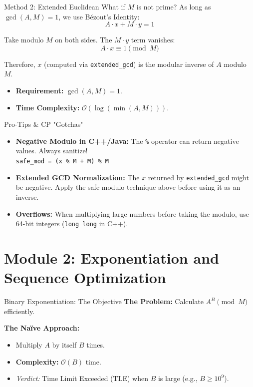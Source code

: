 \documentclass[aspectratio=169]{beamer}
\begin{document}
\begin{frame}{Method 2: Extended Euclidean}
    What if $M$ is not prime? As long as $\gcd(A, M) = 1$, we use Bézout's Identity:
    $$A \cdot x + M \cdot y = 1$$
    
    Take modulo $M$ on both sides. The $M \cdot y$ term vanishes:
    $$A \cdot x \equiv 1 \pmod M$$
    
    \vspace{0.5cm}
    Therefore, $x$ (computed via \texttt{extended\_gcd}) is the modular inverse of $A$ modulo $M$.
    \begin{itemize}
        \item \textbf{Requirement:} $\gcd(A, M) = 1$.
        \item \textbf{Time Complexity:} $\mathcal{O}(\log(\min(A, M)))$.
    \end{itemize}
\end{frame}

\begin{frame}{Pro-Tips \& CP "Gotchas"}
    \begin{itemize}
        \item \textbf{Negative Modulo in C++/Java:} 
        The \texttt{\%} operator can return negative values. Always sanitize! \\
        \texttt{safe\_mod = (x \% M + M) \% M}
        \item \textbf{Extended GCD Normalization:} 
        The $x$ returned by \texttt{extended\_gcd} might be negative. Apply the safe modulo technique above before using it as an inverse.
        \item \textbf{Overflows:} 
        When multiplying large numbers before taking the modulo, use 64-bit integers (\texttt{long long} in C++).
    \end{itemize}
\end{frame}

\section{Module 2: Exponentiation and Sequence Optimization}

\begin{frame}{Binary Exponentiation: The Objective}
    \textbf{The Problem:} Calculate $A^B \pmod{M}$ efficiently.
    
    \vspace{0.5cm}
    \textbf{The Naïve Approach:}
    \begin{itemize}
        \item Multiply $A$ by itself $B$ times.
        \item \textbf{Complexity:} $\mathcal{O}(B)$ time.
        \item \textit{Verdict:} Time Limit Exceeded (TLE) when $B$ is large (e.g., $B \ge 10^9$).
    \end{itemize}
\end{frame}
\end{document}
